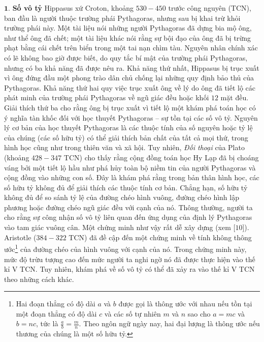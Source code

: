 \begin{multicols}{2}
	\setlength{\abovedisplayskip}{5pt}
	\setlength{\belowdisplayskip}{5pt}
	$\pmb{1.}$ \textbf{\color{lichsutoanhoc}Số vô tỷ}
	\vskip 0.05cm
	Hippasus xứ Croton, khoảng $530-450$ trước công nguyên (TCN), ban đầu là người thuộc trường phái Pythagoras, nhưng sau bị khai trừ khỏi trường phái này. Một tài liệu nói những người Pythagoras đã dựng bia mộ ông, như thể ông đã chết; một tài liệu khác nói rằng sự bội đạo của ông đã bị trừng phạt bằng cái chết trên biển trong một tai nạn chìm tàu. Nguyên nhân chính xác có lẽ không bao giờ được biết, do quy tắc bí mật của trường phái Pythagoras, nhưng có ba khả năng đã được nêu ra. 
	\vskip 0.05cm
	Khả năng thứ nhất, Hippasus bị trục xuất vì ông đứng đầu một phong trào dân chủ chống lại những quy định bảo thủ của Pythagoras.
	\vskip 0.05cm
	Khả năng thứ hai quy việc trục xuất ông về lý do ông đã tiết lộ các phát minh của trường phái Pythagoras về ngũ giác đều hoặc khối $12$ mặt đều. 
	\vskip 0.05cm
	Giải thích thứ ba cho rằng ông bị trục xuất vì tiết lộ một khám phá toán học có ý nghĩa tàn khốc đối với học thuyết Pythagoras -- sự tồn tại các số vô tỷ.
	\vskip 0.1cm
	Nguyên lý cơ bản của học thuyết Pythagoras là các thuộc tính của số nguyên hoặc tỷ lệ của chúng (các số hữu tỷ) có thể giải thích bản chất của tất cả mọi thứ, trong hình học cũng như trong thiên văn và xã hội. Tuy nhiên, \textit{Đối thoại} của Plato (khoảng $428-347$ TCN) cho thấy rằng cộng đồng toán học Hy Lạp đã bị choáng váng bởi một tiết lộ hầu như phá hủy toàn bộ niềm tin của người Pythagoras và cộng đồng vào những con số. Đây là khám phá rằng trong bản  thân hình học, các số hữu tỷ không đủ để giải thích các thuộc tính cơ bản. Chẳng hạn, số hữu tỷ không đủ để so sánh tỷ lệ của đường chéo hình vuông, đường chéo hình lập phương hoặc đường chéo ngũ giác đều với cạnh của nó. 
	\vskip 0.1cm
	Thông thường, người ta cho rằng sự công nhận số vô tỷ liên quan đến ứng dụng của định lý Pythagoras vào tam giác vuông cân. Một chứng minh như vậy rất dễ xây dựng (xem [$10$]). Aristotle ($384-322$ TCN) đã đề cập đến một chứng minh về tính không thông ước\footnote[2]{\color{lichsutoanhoc}Hai đoạn thẳng có độ dài $a$ và $b$ được gọi là thông ước với nhau nếu tồn tại một đoạn thẳng có độ dài $c$ và các số tự nhiên $m$ và $n$ sao cho $a = mc$ và $b = nc$, tức là $\frac{a}{b} = \frac{m}{n}$. Theo ngôn ngữ ngày nay, hai đại lượng là thông ước nếu thương của chúng là một số hữu tỷ.} của đường chéo của hình vuông với cạnh của nó. Trong chứng minh này, mức độ trừu tượng cao đến mức người ta nghi ngờ nó đã được thực hiện vào thế kỉ V TCN. Tuy nhiên,  khám phá về số vô tỷ có thể đã xảy ra vào thế kỉ V TCN theo những cách khác. 

\end{multicols}

